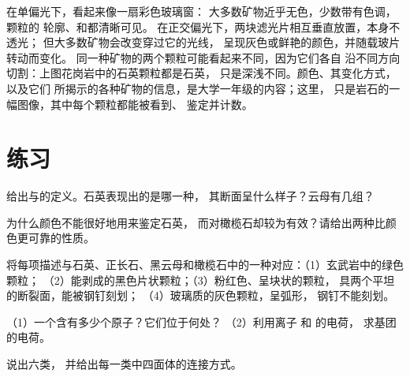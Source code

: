 在单偏光下，看起来像一扇彩色玻璃窗：
大多数矿物近乎无色，少数带有色调，颗粒的
轮廓、和都清晰可见。
在正交偏光下，两块滤光片相互垂直放置，本身不透光；
但大多数矿物会改变穿过它的光线，
呈现灰色或鲜艳的颜色，并随载玻片转动而变化。
同一种矿物的两个颗粒可能看起来不同，因为它们各自
沿不同方向切割：上图花岗岩中的石英颗粒都是石英，
只是深浅不同。颜色、其变化方式，以及它们
所揭示的各种矿物的信息，是大学一年级的内容；这里，
只是岩石的一幅图像，其中每个颗粒都能被看到、
鉴定并计数。

\section{练习}

\begin{exercise}[$\star$]\label{exo:g11:minerals:1}
给出与的定义。石英表现出的是哪一种，
其断面呈什么样子？云母有几组？
\end{exercise}

\begin{exercise}[$\star$]\label{exo:g11:minerals:2}
为什么颜色不能很好地用来鉴定石英，
而对橄榄石却较为有效？请给出两种比颜色更可靠的性质。
\end{exercise}

\begin{exercise}[$\star$]\label{exo:g11:minerals:3}
将每项描述与石英、正长石、黑云母和橄榄石中的一种对应：（1）玄武岩中的绿色颗粒；
（2）能剥成的黑色片状颗粒；（3）粉红色、呈块状的颗粒，
具两个平坦的断裂面，能被钢钉刻划；
（4）玻璃质的灰色颗粒，呈弧形，
钢钉不能刻划。
\end{exercise}

\begin{exercise}[$\star$]\label{exo:g11:minerals:4}
（1）一个含有多少个原子？它们位于何处？
（2）利用离子  和  的电荷，
求基团  的电荷。
\end{exercise}

\begin{exercise}[$\star$]\label{exo:g11:minerals:5}
说出六类，
并给出每一类中四面体的连接方式。
\end{exercise}

